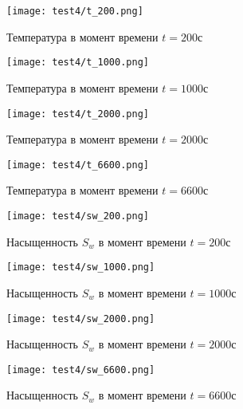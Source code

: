 \begin{figure}
  \begin{center}
    \begin{minipage}[h]{0.49\textwidth}
       \texttt{[image: test4/t\_200.png]}
       \vspace{1cm}
       \caption{Температура в момент времени $t=200$с}
    \end{minipage}
    \hfill
    \begin{minipage}[h]{0.49\textwidth}
       \texttt{[image: test4/t\_1000.png]}
       \vspace{1cm}
       \caption{Температура в момент времени $t=1000$с}
    \end{minipage}
    \vspace{3cm}
    \vfill
    \begin{minipage}[h]{0.49\textwidth}
       \texttt{[image: test4/t\_2000.png]}
       \vspace{1cm}
       \caption{Температура в момент времени $t=2000$с}
    \end{minipage}
    \hfill
    \begin{minipage}[h]{0.49\textwidth}
       \texttt{[image: test4/t\_6600.png]}
       \vspace{1cm}
       \caption{Температура в момент времени $t=6600$с}
    \end{minipage}
    \hfill  
  \end{center}
\end{figure}

\begin{figure}
  \begin{center}
    \begin{minipage}[h]{0.49\textwidth}
       \texttt{[image: test4/sw\_200.png]}
       \vspace{1cm}
       \caption{Насыщенность $S_w$ в момент времени $t=200$с}
    \end{minipage}
    \hfill
    \begin{minipage}[h]{0.49\textwidth}
       \texttt{[image: test4/sw\_1000.png]}
       \vspace{1cm}
       \caption{Насыщенность $S_w$ в момент времени $t=1000$с}
    \end{minipage}
    \vspace{3cm}
    \vfill
    \begin{minipage}[h]{0.49\textwidth}
       \texttt{[image: test4/sw\_2000.png]}
       \vspace{1cm}
       \caption{Насыщенность $S_w$ в момент времени $t=2000$с}
    \end{minipage}
    \hfill
    \begin{minipage}[h]{0.49\textwidth}
       \texttt{[image: test4/sw\_6600.png]}
       \vspace{1cm}
       \caption{Насыщенность $S_w$ в момент времени $t=6600$с}
    \end{minipage}
    \hfill  
  \end{center}
\end{figure}


